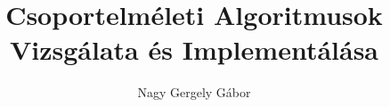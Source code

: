 \documentclass[dvips,a4paper,oneside,12pt]{article}
\numberwithin{equation}{subsection}
\begin{document}
\title{Csoportelméleti Algoritmusok Vizsgálata és Implementálása}
\author{Nagy Gergely Gábor}
\maketitle

\tableofcontents
{}
\clearpage





\nocite{*}


\clearpage

\todototoc
\listoftodos
\end{document}
